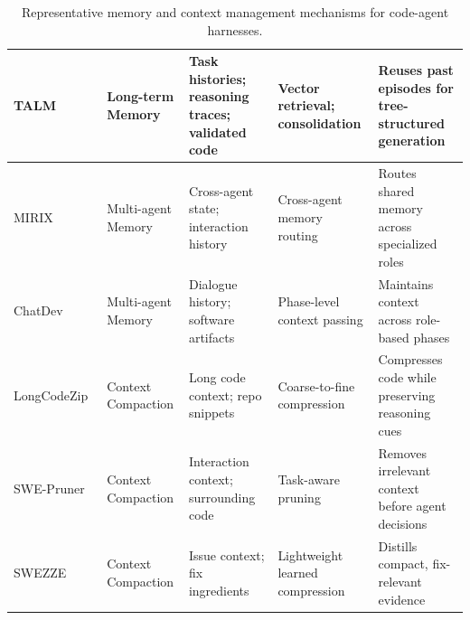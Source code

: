 \documentclass{llmxive}
\begin{document}
\begin{table}[t!]
\begin{tabularx}{\textwidth}{p{2.35cm}p{2.5cm}p{3.2cm}p{2.8cm}X}
TALM~\cite{shen2025talm}
& Long-term Memory 
& Task histories; reasoning traces; validated code
& Vector retrieval; consolidation
& Reuses past episodes for tree-structured generation \\
\midrule

MIRIX~\cite{wang2025mirix} 
& Multi-agent Memory 
& Cross-agent state; interaction history
& Cross-agent memory routing 
& Routes shared memory across specialized roles \\

ChatDev~\cite{qian2024chatdev}
& Multi-agent Memory 
& Dialogue history; software artifacts
& Phase-level context passing
& Maintains context across role-based phases \\
\midrule

LongCodeZip~\cite{shi2025longcodezip} 
& Context Compaction
& Long code context; repo snippets
& Coarse-to-fine compression
& Compresses code while preserving reasoning cues \\

SWE-Pruner~\cite{wang2026swe} 
& Context Compaction
& Interaction context; surrounding code
& Task-aware pruning
& Removes irrelevant context before agent decisions \\

SWEZZE~\cite{jia2026compressing} 
& Context Compaction
& Issue context; fix ingredients
& Lightweight learned compression
& Distills compact, fix-relevant evidence \\
\bottomrule
\end{tabularx}
\label{tab:memory_modules}
\caption{Representative memory and context management mechanisms for code-agent harnesses.}
\end{table}
\end{document}
